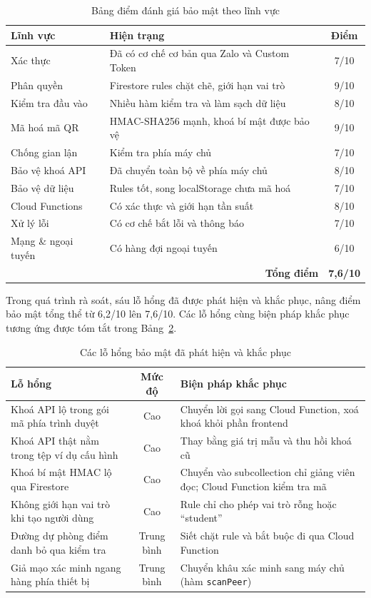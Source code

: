 \documentclass[../main.tex]{subfiles}
\begin{document}
\begin{table}[H]
\centering
\small
\caption{Bảng điểm đánh giá bảo mật theo lĩnh vực}
\label{tab:security-score}
\begin{tabular}{|p{5.2cm}|p{6.4cm}|c|}
\hline
\textbf{Lĩnh vực} & \textbf{Hiện trạng} & \textbf{Điểm} \\
\hline
Xác thực & Đã có cơ chế cơ bản qua Zalo và Custom Token & 7/10 \\ \hline
Phân quyền & Firestore rules chặt chẽ, giới hạn vai trò & 9/10 \\ \hline
Kiểm tra đầu vào & Nhiều hàm kiểm tra và làm sạch dữ liệu & 8/10 \\ \hline
Mã hoá mã QR & HMAC-SHA256 mạnh, khoá bí mật được bảo vệ & 9/10 \\ \hline
Chống gian lận & Kiểm tra phía máy chủ & 7/10 \\ \hline
Bảo vệ khoá API & Đã chuyển toàn bộ về phía máy chủ & 8/10 \\ \hline
Bảo vệ dữ liệu & Rules tốt, song localStorage chưa mã hoá & 7/10 \\ \hline
Cloud Functions & Có xác thực và giới hạn tần suất & 8/10 \\ \hline
Xử lý lỗi & Có cơ chế bắt lỗi và thông báo & 7/10 \\ \hline
Mạng \& ngoại tuyến & Có hàng đợi ngoại tuyến & 6/10 \\ \hline
\multicolumn{2}{|r|}{\textbf{Tổng điểm}} & \textbf{7{,}6/10} \\ \hline
\end{tabular}
\end{table}

Trong quá trình rà soát, sáu lỗ hổng đã được phát hiện và khắc phục, nâng điểm bảo mật tổng
thể từ 6{,}2/10 lên 7{,}6/10. Các lỗ hổng cùng biện pháp khắc phục tương ứng được tóm tắt
trong Bảng~\ref{tab:security-fix}.

\begin{table}[H]
\centering
\small
\caption{Các lỗ hổng bảo mật đã phát hiện và khắc phục}
\label{tab:security-fix}
\begin{tabular}{|p{4.6cm}|c|p{6.6cm}|}
\hline
\textbf{Lỗ hổng} & \textbf{Mức độ} & \textbf{Biện pháp khắc phục} \\
\hline
Khoá API lộ trong gói mã phía trình duyệt & Cao & Chuyển lời gọi sang Cloud Function, xoá khoá khỏi phần frontend \\ \hline
Khoá API thật nằm trong tệp ví dụ cấu hình & Cao & Thay bằng giá trị mẫu và thu hồi khoá cũ \\ \hline
Khoá bí mật HMAC lộ qua Firestore & Cao & Chuyển vào subcollection chỉ giảng viên đọc; Cloud Function kiểm tra mã \\ \hline
Không giới hạn vai trò khi tạo người dùng & Cao & Rule chỉ cho phép vai trò rỗng hoặc ``student'' \\ \hline
Đường dự phòng điểm danh bỏ qua kiểm tra & Trung bình & Siết chặt rule và bắt buộc đi qua Cloud Function \\ \hline
Giả mạo xác minh ngang hàng phía thiết bị & Trung bình & Chuyển khâu xác minh sang máy chủ (hàm \texttt{scanPeer}) \\ \hline
\end{tabular}
\end{table}
\end{document}
